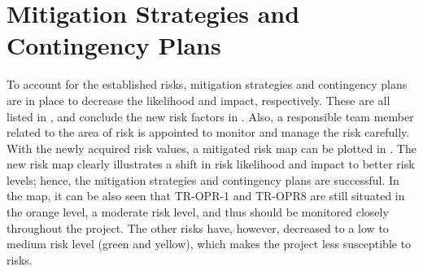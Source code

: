 \section{Mitigation Strategies and Contingency Plans}
\label{sec:mitandcont}
To account for the established risks, mitigation strategies and contingency plans are in place to decrease the likelihood and impact, respectively.
These are all listed in , and conclude the new risk factors in .
Also, a responsible team member related to the area of risk is appointed to monitor and manage the risk carefully.
With the newly acquired risk values, a mitigated risk map can be plotted in .
The new risk map clearly illustrates a shift in risk likelihood and impact to better risk levels; hence, the mitigation strategies and contingency plans are successful.
In the map, it can be also seen that TR-OPR-1 and TR-OPR8 are still situated in the orange level, a moderate risk level, and thus should be monitored closely throughout the project.
The other risks have, however, decreased to a low to medium risk level (green and yellow),
which makes the project less susceptible to risks.



